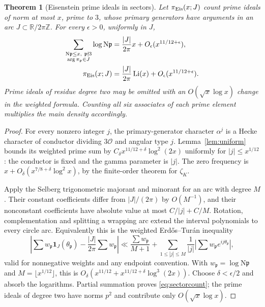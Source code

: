\documentclass[11pt,a4paper]{article}
\numberwithin{equation}{section}
\newtheorem{theorem}{Theorem}[section]
\theoremstyle{definition}
\theoremstyle{remark}
\newcommand{\R}{\mathbb R}
\newcommand{\Z}{\mathbb Z}
\newcommand{\OO}{\mathcal O}
\newcommand{\N}{\mathrm N}
\newcommand{\ind}{\mathbf 1}
\begin{document}
\begin{theorem}[Eisenstein prime ideals in sectors]\label{thm:sectors}
Let $\pi_{\rm Eis}(x;J)$ count prime ideals of norm at most $x$, prime to $3$, whose primary generators have arguments in an arc $J\subset\R/2\pi\Z$. For every $\epsilon>0$, uniformly in $J$,
\begin{align}\label{eq:sectorweighted}
 \sum_{\substack{\N\mathfrak p\le x,\ \mathfrak p\nmid3\\\arg\pi_\mathfrak p\in J}}\log\N\mathfrak p
 &=\frac{|J|}{2\pi}x+O_\epsilon(x^{11/12+\epsilon}),\\
 \pi_{\rm Eis}(x;J)&=\frac{|J|}{2\pi}\operatorname{Li}(x)+O_\epsilon(x^{11/12+\epsilon}).\label{eq:sectorcount}
\end{align}
Prime ideals of residue degree two may be omitted with an $O(\sqrt x\log x)$ change in the weighted formula. Counting all six associates of each prime element multiplies the main density accordingly.
\end{theorem}
\begin{proof}
For every nonzero integer $j$, the primary-generator character $\alpha^j$ is a Hecke character of conductor dividing $3\OO$ and angular type $j$. Lemma~\ref{lem:uniform} bounds its weighted prime sum by
$C_\delta x^{11/12+\delta}\log^2(2x)$ uniformly for $|j|\le x^{1/12}$: the conductor is fixed and the gamma parameter is $|j|$. The zero frequency is $x+O_\delta(x^{7/8+\delta}\log^2x)$, by the finite-order theorem for $\zeta_K$.

Apply the Selberg trigonometric majorant and minorant for an arc with degree $M$ \cite[Lemma 2.1 and its proof]{PT}. Their constant coefficients differ from $|J|/(2\pi)$ by $O(M^{-1})$, and their nonconstant coefficients have absolute value at most $C/|j|+C/M$. Rotation, complementation and splitting a wrapping arc extend the interval polynomials to every circle arc. Equivalently this is the weighted Erd\H{o}s--Tur\'an inequality
\[
 \left|\sum w_\mathfrak p\ind_J(\theta_\mathfrak p)-\frac{|J|}{2\pi}\sum w_\mathfrak p\right|
 \ll\frac{\sum w_\mathfrak p}{M+1}
 +\sum_{1\le|j|\le M}\frac1{|j|}\left|\sum w_\mathfrak p e^{ij\theta_\mathfrak p}\right|,
\]
valid for nonnegative weights and any endpoint convention. With $w_\mathfrak p=\log\N\mathfrak p$ and $M=\lfloor x^{1/12}\rfloor$, this is
$O_\delta(x^{11/12}+x^{11/12+\delta}\log^3(2x))$. Choose $\delta<\epsilon/2$ and absorb the logarithms. Partial summation proves \eqref{eq:sectorcount}; the prime ideals of degree two have norms $p^2$ and contribute only $O(\sqrt x\log x)$.
\end{proof}
\end{document}
